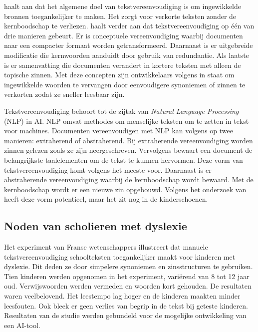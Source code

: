 \textcite{Shardlow2014} haalt aan dat het algemene doel van tekstvereenvoudiging is om ingewikkelde bronnen toegankelijker te maken. Het zorgt voor verkorte teksten zonder de kernboodschap te verliezen. \textcite{Siddharthan2014} haalt verder aan dat tekstvereenvoudiging op één van drie manieren gebeurt. Er is conceptuele vereenvoudiging waarbij documenten naar een compacter formaat worden getransformeerd. Daarnaast is er uitgebreide modificatie die kernwoorden aanduidt door gebruik van redundantie. Als laatste is er samenvatting die documenten verandert in kortere teksten met alleen de topische zinnen. Met deze concepten zijn ontwikkelaars volgens \textcite{Siddharthan2014} in staat om ingewikkelde woorden te vervangen door eenvoudigere synoniemen of zinnen te verkorten zodat ze sneller leesbaar zijn.

Tekstvereenvoudiging behoort tot de zijtak van \textit{Natural Language Processing} (NLP) in AI. NLP omvat methodes om menselijke teksten om te zetten in tekst voor machines. Documenten vereenvoudigen met NLP kan volgens \textcite{Chowdhary2020} op twee manieren: extraherend of abstraherend. Bij extraherende vereenvoudiging worden zinnen gelezen zoals ze zijn neergeschreven. Vervolgens bewaart een document de belangrijkste taalelementen om de tekst te kunnen hervormen. Deze vorm van tekstvereenvoudiging komt volgens \autocite{Sciforce2020} het meeste voor. Daarnaast is er abstraherende vereenvoudiging waarbij de kernboodschap wordt bewaard. Met de kernboodschap wordt er een nieuwe zin opgebouwd. Volgens het onderzoek van \textcite{Chowdhary2020} heeft deze vorm potentieel, maar het zit nog in de kinderschoenen.

\subsection{Noden van scholieren met dyslexie}

Het experiment van Franse wetenschappers \newline \textcite{Gala2016} illustreert dat manuele tekstvereenvoudiging schoolteksten toegankelijker \newline maakt voor kinderen met dyslexie. Dit deden ze door simpelere synoniemen en zinsstructuren te gebruiken. Tien kinderen werden opgenomen in het experiment, variërend van 8 tot 12 jaar oud. Verwijswoorden werden vermeden en woorden kort gehouden. De resultaten waren veelbelovend. Het leestempo lag hoger en de kinderen maakten minder leesfouten. Ook bleek er geen verlies van begrip in de tekst bij geteste kinderen. Resultaten van de studie werden gebundeld voor de mogelijke ontwikkeling van een AI-tool.

